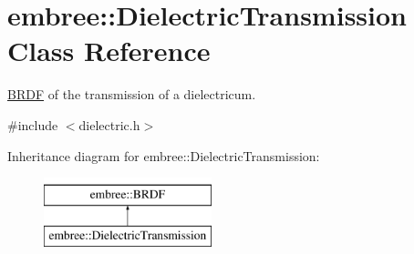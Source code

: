 \hypertarget{classembree_1_1_dielectric_transmission}{
\section{embree::DielectricTransmission Class Reference}
\label{classembree_1_1_dielectric_transmission}
}


\hyperlink{classembree_1_1_b_r_d_f}{BRDF} of the transmission of a dielectricum.  




{\ttfamily \#include $<$dielectric.h$>$}

Inheritance diagram for embree::DielectricTransmission:\begin{figure}[H]
\begin{center}
\leavevmode
\includegraphics[height=2.000000cm]{classembree_1_1_dielectric_transmission}
\end{center}
\end{figure}
